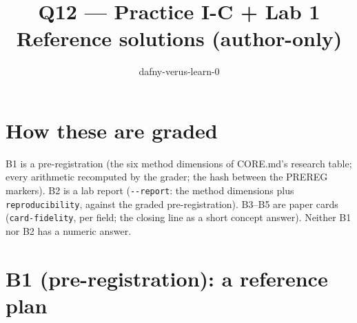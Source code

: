 \documentclass[11pt]{article}
\title{Q12 --- Practice I-C + Lab 1 \\ \large Reference solutions (author-only)}
\author{dafny-verus-learn-0}
\date{}
\begin{document}
\maketitle
\sloppy

\section*{How these are graded}
B1 is a pre-registration (the six method dimensions of CORE.md's research
table; every arithmetic recomputed by the grader; the hash between the PREREG
markers). B2 is a lab report (\verb+--report+: the method dimensions plus
\texttt{reproducibility}, against the graded pre-registration). B3--B5 are
paper cards (\texttt{card-fidelity}, per field; the closing line as a short
concept answer). Neither B1 nor B2 has a numeric answer.

\section*{B1 (pre-registration): a reference plan}
\end{document}
